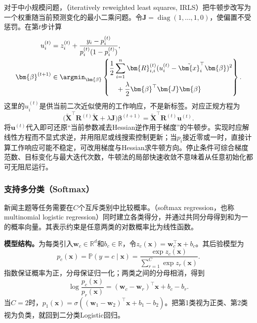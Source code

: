 对于中小规模问题，（iteratively reweighted least squares, IRLS）把牛顿步改写为一个权重随当前预测变化的最小二乘问题。令$\bm{J}=\operatorname{diag}(1,\ldots,1,0)$，使偏置不受惩罚。在第$t$步计算
\begin{equation}
  \label{eq:classification-logistic-irls}
  \begin{aligned}
    u_i^{(t)}
      &=z_i^{(t)}
        +\frac{y_i-p_i^{(t)}}{p_i^{(t)}(1-p_i^{(t)})},\\
    \bm{\beta}^{(t+1)}
      &\in\argmin_{\bm{\beta}}\left\{
        \begin{aligned}
          &\frac12\sum_{i=1}^{n}\bm{R}_{i,i}^{(t)}
            (u_i^{(t)}-\tilde{\bm{x}}_i^{\top}\bm{\beta})^2\\
          &\quad{}+\frac{\lambda}{2}
            \bm{\beta}^{\top}\bm{J}\bm{\beta}
        \end{aligned}
      \right\}.
  \end{aligned}
\end{equation}
这里的$u_i^{(t)}$是供当前二次近似使用的工作响应，不是新标签。对应正规方程为
\[
  \bigl(\tilde{\bm{X}}^{\top}\bm{R}^{(t)}\tilde{\bm{X}}
       +\lambda\bm{J}\bigr)\bm{\beta}^{(t+1)}
  =\tilde{\bm{X}}^{\top}\bm{R}^{(t)}\bm{u}^{(t)}.
\]
将$\bm{u}^{(t)}$代入即可还原“当前参数减去Hessian逆作用于梯度”的牛顿步。实现时应解线性方程而不显式求逆，并用阻尼或线搜索控制更新；当$p_i$接近零或一时，直接计算工作响应可能不稳定，可改用梯度与Hessian求牛顿方向。停止条件可综合梯度范数、目标变化与最大迭代次数，牛顿法的局部快速收敛不意味着从任意初始化都可无阻尼运行。

\subsubsection{支持多分类（Softmax）}
\label{sec:classification-logistic-softmax}

新闻主题等任务需要在$C$个互斥类别中比较概率。（softmax regression，也称multinomial logistic regression）同时建立各类得分，并通过共同分母得到和为一的概率向量。其表示约束是任意两类的对数概率比为线性函数。

\textbf{模型结构。}为每类引入$\bm{w}_c\in\mathbb{R}^{d}$和$b_c\in\mathbb{R}$，令$z_c(\bm{x})=\bm{w}_c^{\top}\bm{x}+b_c$。其后验模型为
\begin{equation}
  \label{eq:classification-softmax-model}
  p_c(\bm{x})
  =\mathbb{P}(y=c\mid\bm{x})
  =\frac{\exp z_c(\bm{x})}
         {\sum_{r=1}^{C}\exp z_r(\bm{x})}.
\end{equation}
指数保证概率为正，分母保证归一化；两类之间的分母相消，得到
\[
  \log\frac{p_c(\bm{x})}{p_r(\bm{x})}
  =(\bm{w}_c-\bm{w}_r)^{\top}\bm{x}+b_c-b_r.
\]
当$C=2$时，$p_1(\bm{x})=\sigma((\bm{w}_1-\bm{w}_2)^{\top}\bm{x}+b_1-b_2)$。把第1类视为正类、第2类视为负类，就回到二分类Logistic回归。

